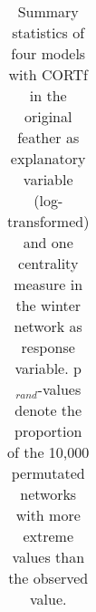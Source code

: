 \documentclass[10pt, twoside]{book} %
\begin{document}
\clearpage	
\begin{table}[h!]
	\begin{center}
		\begin{footnotesize}
			\caption{Summary statistics of four models with CORTf in the original feather as explanatory variable (log-transformed) and one centrality measure in the winter network as response variable. p$_{rand}$-values denote the proportion of the 10,000 permutated networks with more extreme values than the observed value.} \label{tab4-1} 
			
			\begingroup
			\setlength{\tabcolsep}{8pt} %
			\renewcommand{\arraystretch}{1.5} %
			\begin{tabular}{p{2cm} l r r r }
				

\end{tabular}
\end{footnotesize}
\end{center}
\end{table}
\end{document}
